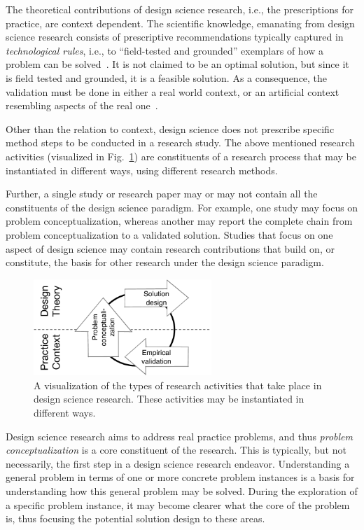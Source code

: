 \documentclass[graybox]{svmult}
\begin{document}
The theoretical contributions of design science research, i.e., the prescriptions for practice, are context dependent. The scientific knowledge, emanating from design science research consists of prescriptive recommendations typically captured in \emph{technological rules}, i.e., to ``field-tested and grounded'' exemplars of how a problem can be solved~\citep{van_aken_management_2004}. It is not claimed to be an optimal solution, but since it is field tested and grounded, it is a feasible solution.
As a consequence, the validation must be done in either a real world context, or an artificial context resembling aspects of the real one~\citep{wieringa_what_2014}.  

Other than the relation to context, design science does not prescribe specific method steps to be conducted in a research study. The above mentioned research activities (visualized in Fig.~\ref{fig:DS_process}) are constituents of a research process that may be instantiated in different ways, using different research methods. 

Further, a single study or research paper may or may not contain all the constituents of the design science paradigm. For example, one study may focus on problem conceptualization, whereas another may report the complete chain from problem conceptualization to a validated solution. Studies that focus on one aspect of design science may contain research contributions that build on, or constitute, the basis for other research under the design science paradigm.


\begin{figure}[t]
\centering
 \includegraphics[width=0.6\textwidth]{Figures/DSSE_process.pdf}
\caption{A visualization of the types of research activities that take place in design science research. These activities may be instantiated in different ways.}
\label{fig:DS_process}       %
\end{figure}


Design science research aims to address real practice problems, and thus \emph{problem conceptualization} is a core constituent of the research. This is typically, but not necessarily, the first step in a design science research endeavor. Understanding a general problem in terms of one or more concrete problem instances is a basis for understanding how this general problem may be solved. During the exploration of a specific problem instance, it may become clearer what the core of the problem is, thus focusing the potential solution design to these areas. 
\end{document}
